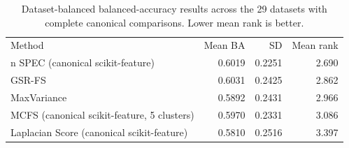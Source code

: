 \begin{table}[ht]
\centering
\caption{Dataset-balanced balanced-accuracy results across the 29 datasets with complete canonical comparisons. Lower mean rank is better.}
\label{tab:canonical_ba}
\begin{tabular}{lrrr}
\hline
Method & Mean BA & SD & Mean rank \\n\hline
SPEC (canonical scikit-feature) & 0.6019 & 0.2251 & 2.690 \\
GSR-FS & 0.6031 & 0.2425 & 2.862 \\
MaxVariance & 0.5892 & 0.2431 & 2.966 \\
MCFS (canonical scikit-feature, 5 clusters) & 0.5970 & 0.2331 & 3.086 \\
Laplacian Score (canonical scikit-feature) & 0.5810 & 0.2516 & 3.397 \\
\hline
\end{tabular}
\end{table}

